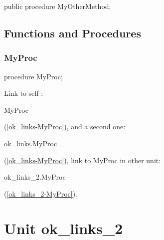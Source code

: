 \documentclass{report}
\begin{document}
\begin{list}{}{
\setlength{\itemindent}{0cm}
\setlength{\listparindent}{0cm}
\setlength{\leftmargin}{\evensidemargin}
\addtolength{\leftmargin}{\tmplength}
\settowidth{\labelsep}{X}
\addtolength{\leftmargin}{\labelsep}
\setlength{\labelwidth}{\tmplength}
}
\begin{flushleft}
\item[\textbf{Declaration}\hfill]
\begin{ttfamily}
public procedure MyOtherMethod;\end{ttfamily}


\end{flushleft}
\end{list}
\section{Functions and Procedures}
\subsection*{MyProc}
\begin{list}{}{
\setlength{\itemindent}{0cm}
\setlength{\listparindent}{0cm}
\setlength{\leftmargin}{\evensidemargin}
\addtolength{\leftmargin}{\tmplength}
\settowidth{\labelsep}{X}
\addtolength{\leftmargin}{\labelsep}
\setlength{\labelwidth}{\tmplength}
}
\begin{flushleft}
\item[\textbf{Declaration}\hfill]
\begin{ttfamily}
procedure MyProc;\end{ttfamily}


\end{flushleft}
\par
\item[\textbf{Description}]
Link to self : \begin{ttfamily}MyProc\end{ttfamily}(\ref{ok_links-MyProc}), and a second one: \begin{ttfamily}ok{\_}links.MyProc\end{ttfamily}(\ref{ok_links-MyProc}), link to MyProc in other unit: \begin{ttfamily}ok{\_}links{\_}2.MyProc\end{ttfamily}(\ref{ok_links_2-MyProc}).

\end{list}
\chapter{Unit ok{\_}links{\_}2}
\end{document}
